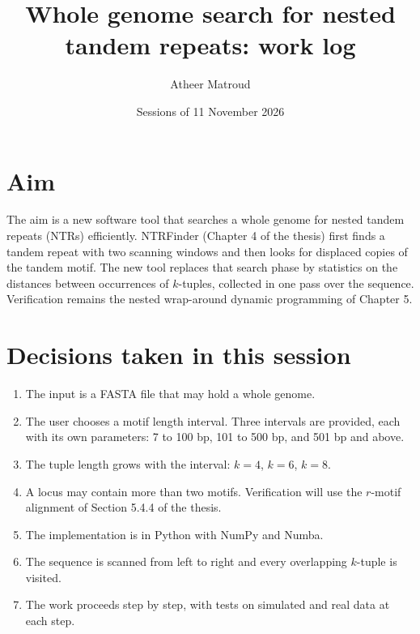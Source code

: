 \documentclass[11pt,a4paper]{article}
\title{Whole genome search for nested tandem repeats: work log}
\author{Atheer Matroud}
\date{Sessions of 11 November 2026}
\begin{document}
\maketitle

\section{Aim}
The aim is a new software tool that searches a whole genome for nested tandem
repeats (NTRs) efficiently. NTRFinder (Chapter 4 of the thesis) first finds a
tandem repeat with two scanning windows and then looks for displaced copies of
the tandem motif. The new tool replaces that search phase by statistics on the
distances between occurrences of $k$-tuples, collected in one pass over the
sequence. Verification remains the nested wrap-around dynamic programming of
Chapter 5.

\section{Decisions taken in this session}
\begin{enumerate}
\item The input is a FASTA file that may hold a whole genome.
\item The user chooses a motif length interval. Three intervals are provided,
      each with its own parameters: 7 to 100 bp, 101 to 500 bp, and 501 bp and
      above.
\item The tuple length grows with the interval: $k=4$, $k=6$, $k=8$.
\item A locus may contain more than two motifs. Verification will use the
      $r$-motif alignment of Section 5.4.4 of the thesis.
\item The implementation is in Python with NumPy and Numba.
\item The sequence is scanned from left to right and every overlapping
      $k$-tuple is visited.
\item The work proceeds step by step, with tests on simulated and real data at
      each step.
\end{enumerate}
\end{document}
